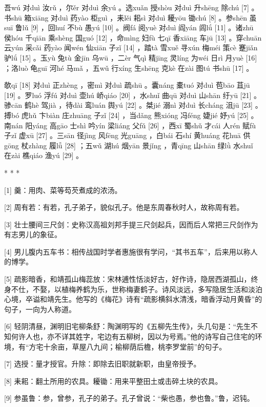 \documentclass[12pt,UTF8]{ctexbook}
\begin{document}
吾wú 对duì 汝rǔ ，尔ěr 对duì 余yú 。选xuǎn 授shòu 对duì 升shēng 除chú [7] 。书shū 箱xiāng 对duì 药yào 柜guì ，耒lěi 耜sì 对duì 耰yōu 锄chú [8] 。参shēn 虽suī 鲁lǔ [9] ，回huí 不bù 愚yú [10] 。阀fá 阅yuè 对duì 阎yán 闾lǘ [11] 。诸zhū 侯hóu 千qiān 乘shèng 国guó [12] ，命mìng 妇fù 七qī 香xiāng 车jū [13] 。穿chuān 云yún 采cǎi 药yào 闻wén 仙xiān 子zǐ [14] ，踏tà 雪xuě 寻xún 梅méi 策cè 蹇jiǎn 驴lǘ [15] 。玉yù 兔tù 金jīn 乌wū ，二èr 气qì 精jīng 灵líng 为wéi 日rì 月yuè [16] ；洛luò 龟guī 河hé 马mǎ ，五wǔ 行xíng 生shēng 克kè 在zài 图tú 书shū [17] 。

欹qī [18] 对duì 正zhèng ，密mì 对duì 疏shū 。囊náng 橐tuó 对duì 苞bāo 苴jū [19] 。罗luó 浮fú 对duì 壶hú 峤qiáo [20] ，水shuǐ 曲qū 对duì 山shān 纡yū [21] 。骖cān 鹤hè 驾jià ，待dài 鸾luán 舆yú [22] 。桀jié 溺nì 对duì 长cháng 沮jū [23] 。搏bó 虎hǔ 卞biàn 庄zhuāng 子zǐ [24] ，当dǎng 熊xióng 冯féng 婕jié 妤yú [25] 。南nán 阳yáng 高gāo 士shì 吟yín 梁liáng 父fǔ [26] ，西xī 蜀shǔ 才cái 人rén 赋fù 子zǐ 虚xū [27] 。三sān 径jìng 风fēng 光guāng ，白bái 石shí 黄huáng 花huā 供gōng 杖zhàng 履lǚ [28] ；五wǔ 湖hú 烟yān 景jǐng ，青qīng 山shān 绿lǜ 水shuǐ 在zài 樵qiáo 渔yú [29] 。



* * *



[1] 羹：用肉、菜等芶芡煮成的浓汤。

[2] 周有若：有若，孔子弟子，貌似孔子。他是东周春秋时人，故称周有若。

[3] 壮士腰间三尺剑：史称汉高祖刘邦手提三尺剑起兵，因而后人常把三尺剑作为有志男儿的象征。

[4] 男儿腹内五车书：相传战国时学者惠施很有学问，“其书五车”，后来用以称人的博学。

[5] 疏影暗香，和靖孤山梅蕊放：宋林逋性恬淡好古，好作诗，隐居西湖孤山，终身不仕，不娶，以植梅养鹤为乐，世称梅妻鹤子。诗风淡远，多写隐居生活和淡泊心境，卒谥和靖先生。他写的《梅花》诗有“疏影横斜水清浅，暗香浮动月黄昏”的句子，一向为人称道。

[6] 轻阴清昼，渊明旧宅柳条舒：陶渊明写的《五柳先生传》，头几句是：“先生不知何许人也，亦不详其姓字，宅边有五柳树，因以为号焉。”他的诗写自己住宅的环境，有“方宅十余亩，草屋八九间；榆柳荫后檐，桃李罗堂前”的句子。

[7] 选授：量才授官。升除：即除去旧职就新职，由皇帝授予。

[8] 耒耜：翻土所用的农具。耰锄：用来平整田土或击碎土块的农具。

[9] 参虽鲁：参，曾参，孔子的弟子。孔子曾说：“柴也愚，参也鲁。”鲁，迟钝。
\end{document}
